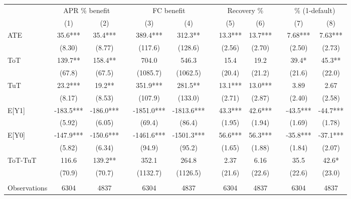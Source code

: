 \begin{tabular}{lccccccccccc}
\toprule
      & \multicolumn{2}{c}{APR \% benefit} &       & \multicolumn{2}{c}{FC benefit} &       & \multicolumn{2}{c}{Recovery \%} &       & \multicolumn{2}{c}{\% (1-default)} \\
\cmidrule{2-3}\cmidrule{5-6}\cmidrule{8-9}\cmidrule{11-12}      & (1)   & (2)   &       & (3)   & (4)   &       & (5)   & (6)   &       & (7)   & (8) \\
\midrule
\midrule
ATE   & 35.6*** & 35.4*** &       & 389.4*** & 312.3** &       & 13.3*** & 13.7*** &       & 7.68*** & 7.63*** \\
      & (8.30) & (8.77) &       & (117.6) & (128.6) &       & (2.56) & (2.70) &       & (2.50) & (2.73) \\
ToT   & 139.7** & 158.4** &       & 704.0 & 546.3 &       & 15.4  & 19.2  &       & 39.4* & 45.3** \\
      & (67.8) & (67.5) &       & (1085.7) & (1062.5) &       & (20.4) & (21.2) &       & (21.6) & (22.0) \\
TuT   & 23.2*** & 19.2** &       & 351.9*** & 281.5** &       & 13.1*** & 13.0*** &       & 3.89  & 2.67 \\
      & (8.17) & (8.53) &       & (107.9) & (133.0) &       & (2.71) & (2.87) &       & (2.40) & (2.58) \\
E[Y1] & -183.5*** & -186.0*** &       & -1851.0*** & -1813.6*** &       & 43.3*** & 42.6*** &       & -43.5*** & -44.7*** \\
      & (5.92) & (6.05) &       & (69.4) & (86.4) &       & (1.95) & (1.94) &       & (1.69) & (1.78) \\
E[Y0] & -147.9*** & -150.6*** &       & -1461.6*** & -1501.3*** &       & 56.6*** & 56.3*** &       & -35.8*** & -37.1*** \\
      & (5.82) & (6.34) &       & (94.9) & (95.2) &       & (1.65) & (1.88) &       & (1.84) & (2.07) \\
ToT-TuT & 116.6 & 139.2** &       & 352.1 & 264.8 &       & 2.37  & 6.16  &       & 35.5  & 42.6* \\
      & (70.9) & (70.7) &       & (1132.7) & (1126.5) &       & (21.6) & (22.6) &       & (22.6) & (23.0) \\
      &       &       &       &       &       &       &       &       &       &       &  \\
\midrule
Observations & 6304  & 4837  &       & 6304  & 4837  &       & 6304  & 4837  &       & 6304  & 4837 \\

\end{tabular}
